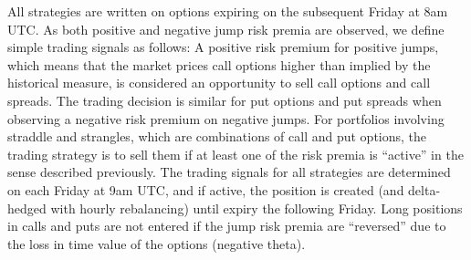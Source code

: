 \documentclass[11pt,a4paper]{article}
\numberwithin{equation}{section}
\theoremstyle{remark}
\theoremstyle{definition}
\begin{document}
All strategies are written on options expiring on the subsequent Friday at 8am UTC.
As both positive and negative jump risk premia are observed, we define simple trading signals as follows: A positive risk premium for positive jumps, which means that the market prices call options higher than implied by the historical measure, is considered an opportunity to sell call options and call spreads.
The trading decision is similar for put options and put spreads when observing a negative risk premium on negative jumps.
For portfolios involving straddle and strangles, which are combinations of call and put options, the trading strategy is to sell them if at least one of the risk premia is ``active'' in the sense described previously.
The trading signals for all strategies are determined on each Friday at 9am UTC, and if active, the position is created (and delta-hedged with hourly rebalancing) until expiry the following Friday. Long positions in calls and puts are not entered if the jump risk premia are ``reversed'' due to the loss in time value of the options (negative theta).
\end{document}
